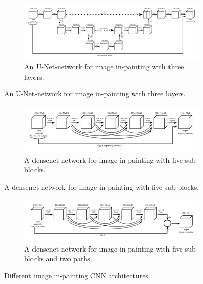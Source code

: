 \begin{figure}[H]
	\centering
	\begin{subfigure}{.95\textwidth}
	\includegraphics[width=\linewidth]{models_painting/unet.png}
	\caption[figure]{An U-Net-network for image in-painting with three layers.}
	\label{fig:paint_unet}
	\end{subfigure}
\end{figure}
\begin{figure}[H]
  \ContinuedFloat
  \centering
	\begin{subfigure}{.95\textwidth}
	\includegraphics[width=\linewidth]{models_painting/densenet.png}
	\caption[figure]{A densenet-network for image in-painting with five sub-blocks.}
	\label{fig:paint_densenet}
	\end{subfigure}
\end{figure}
\begin{figure}[H]
  \ContinuedFloat
  \centering
  \begin{subfigure}{.95\textwidth}
	\includegraphics[width=\linewidth]{models_painting/densenet2.png}
	\caption[figure]{A densenet-network for image in-painting with five sub-blocks and two paths.}
	\label{fig:paint_densenet2}
	\end{subfigure}
  	
	\caption[figure]{Different image in-painting CNN architectures.}
		\label{fig:paint_architectures}
\end{figure}


